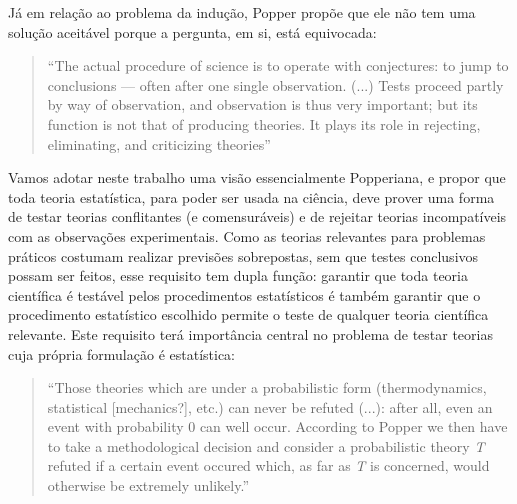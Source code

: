 Já em relação ao problema da indução, Popper propõe que ele não tem uma solução aceitável porque a pergunta, em si, está
equivocada:

\begin{quote}
``The actual procedure of science is to operate with conjectures: to jump to conclusions — often after one single observation.
(...) Tests proceed partly by way of observation, and observation is thus very important; but its function is not that of 
producing theories. It plays its role in rejecting, eliminating, and criticizing theories'' \citep{Popper63}
\end{quote}

Vamos adotar neste trabalho uma visão essencialmente Popperiana, e propor que toda teoria estatística, para poder ser
usada na ciência, deve prover uma forma de testar teorias conflitantes (e comensuráveis)
e de rejeitar teorias incompatíveis com as observações experimentais. Como as teorias relevantes para problemas práticos costumam
realizar previsões sobrepostas, %
sem que testes conclusivos possam ser feitos, esse requisito tem dupla função: garantir
que toda teoria científica é testável pelos procedimentos estatísticos é também garantir que o procedimento estatístico escolhido
permite o teste de qualquer teoria científica relevante. Este requisito terá importância central no problema de testar
teorias cuja própria formulação é estatística:

\begin{quote}
``Those theories which are under a probabilistic form (thermodynamics, statistical [mechanics?], etc.) can never be refuted (...):
after all, even an event with probability 0 can well occur. According to Popper we then have to take a methodological decision
and consider a probabilistic theory {\em T} refuted if a certain event occured which, as far as {\em T} is concerned, would 
otherwise be extremely unlikely.'' \citep{deFinetti2010}
\end{quote}

